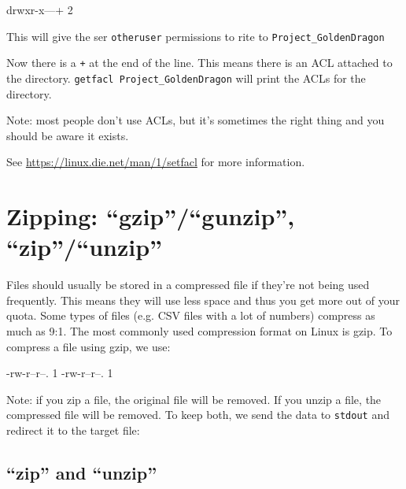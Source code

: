 \begin{prompt}
drwxr-x---+ 2 %
\end{prompt}

This will give the ser \lstinline|otheruser| permissions to rite
to \lstinline|Project_GoldenDragon|

Now there is a \lstinline|+| at the end of the line. This means there is an ACL attached
to the directory. \lstinline|getfacl Project_GoldenDragon| will print the ACLs for the
directory.

Note: most people don't use ACLs, but it's sometimes the right thing and you
should be aware it exists.

See \url{https://linux.die.net/man/1/setfacl} for more information.

\section{Zipping: ``gzip''/``gunzip'', ``zip''/``unzip''}

Files should usually be stored in a compressed file if they're not being used
frequently. This means they will use less space and thus you get more out of
your quota. Some types of files (e.g. CSV files with a lot of numbers) compress
as much as 9:1. The most commonly used compression format on Linux is gzip. To
compress a file using gzip, we use:

\begin{prompt}
    -rw-r--r--. 1 %
    -rw-r--r--. 1 %
\end{prompt}

Note: if you zip a file, the original file will be removed. If you unzip a file,
the compressed file will be removed. To keep both, we send the data to
\lstinline|stdout| and redirect it to the target file:

\begin{prompt}
\end{prompt}

\subsection{``zip'' and ``unzip''}

